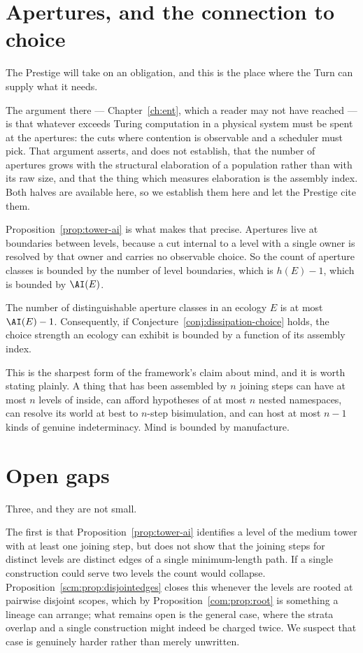 \section{Apertures, and the connection to choice}

The Prestige will take on an obligation, and this is the place where the
Turn can supply what it needs.

The argument there --- Chapter~\ref{ch:ent}, which a reader may not have
reached --- is that whatever exceeds Turing computation in a physical
system must be spent at the apertures: the cuts where contention is
observable and a scheduler must pick.
That argument asserts, and does not establish, that the number of
apertures grows with the structural elaboration of a population rather
than with its raw size, and that the thing which measures elaboration is
the assembly index.
Both halves are available here, so we establish them here and let the
Prestige cite them.

Proposition~\ref{prop:tower-ai} is what makes that precise.
Apertures live at boundaries between levels, because a cut internal to a
level with a single owner is resolved by that owner and carries no
observable choice.
So the count of aperture classes is bounded by the number of level
boundaries, which is $h(E) - 1$, which is bounded by $\AI(E)$.

\begin{corollary}
\label{cor:ai-choice}
The number of distinguishable aperture classes in an ecology $E$ is at
most $\AI(E) - 1$.
Consequently, if Conjecture~\ref{conj:dissipation-choice} holds, the
choice strength an ecology can exhibit is bounded by a function of its
assembly index.
\end{corollary}

This is the sharpest form of the framework's claim about mind, and it is
worth stating plainly.
A thing that has been assembled by $n$ joining steps can have at most $n$
levels of inside, can afford hypotheses of at most $n$ nested
namespaces, can resolve its world at best to $n$-step bisimulation, and
can host at most $n-1$ kinds of genuine indeterminacy.
Mind is bounded by manufacture.

\section{Open gaps}

Three, and they are not small.

The first is that Proposition~\ref{prop:tower-ai} identifies a level of
the medium tower with at least one joining step, but does not show that
the joining steps for distinct levels are distinct edges of a single
minimum-length path.
If a single construction could serve two levels the count would collapse.
Proposition~\ref{scm:prop:disjointedges} closes this whenever the levels
are rooted at pairwise disjoint scopes, which by
Proposition~\ref{com:prop:root} is something a lineage can arrange; what
remains open is the general case, where the strata overlap and a single
construction might indeed be charged twice.
We suspect that case is genuinely harder rather than merely unwritten.

